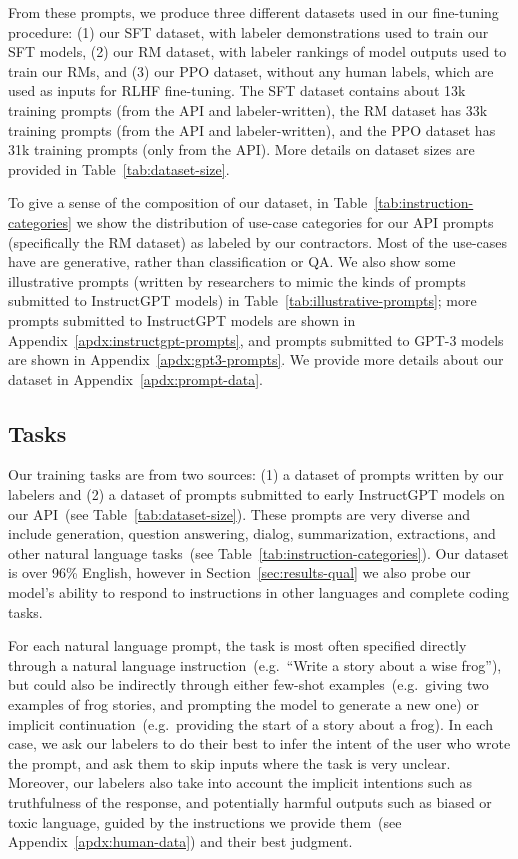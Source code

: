 \documentclass{article}
\begin{document}
From these prompts, we produce three different datasets used in our fine-tuning procedure: (1) our SFT dataset, with labeler demonstrations used to train our SFT models, (2) our RM dataset, with labeler rankings of model outputs used to train our RMs, and (3) our PPO dataset, without any human labels, which are used as inputs for RLHF fine-tuning. The SFT dataset contains about 13k training prompts (from the API and labeler-written), the RM dataset has 33k training prompts (from the API and labeler-written), and the PPO dataset has 31k training prompts (only from the API). More details on dataset sizes are provided in Table~\ref{tab:dataset-size}. 

To give a sense of the composition of our dataset, in Table~\ref{tab:instruction-categories} we show the distribution of use-case categories for our API prompts (specifically the RM dataset) as labeled by our contractors. Most of the use-cases have are generative, rather than classification or QA. We also show some illustrative prompts (written by researchers to mimic the kinds of prompts submitted to InstructGPT models) in Table~\ref{tab:illustrative-prompts}; more prompts submitted to InstructGPT models are shown in Appendix~\ref{apdx:instructgpt-prompts}, and prompts submitted to GPT-3 models are shown in Appendix~\ref{apdx:gpt3-prompts}.
We provide more details about our dataset in Appendix~\ref{apdx:prompt-data}.

\subsection{Tasks}
\label{sec:task}

Our training tasks are from two sources: (1) a dataset of prompts written by our labelers and (2) a dataset of prompts submitted to early InstructGPT models on our API~(see Table~\ref{tab:dataset-size}). These prompts are very diverse and include generation, question answering, dialog, summarization, extractions, and other natural language tasks~(see Table~\ref{tab:instruction-categories}). Our dataset is over 96\% English, however in Section~\ref{sec:results-qual} we also probe our model's ability to respond to instructions in other languages and complete coding tasks.

For each natural language prompt, the task is most often specified directly through a natural language instruction~(e.g.\ ``Write a story about a wise frog''), but could also be indirectly through either few-shot examples~(e.g.\ giving two examples of frog stories, and prompting the model to generate a new one) or implicit continuation~(e.g.\ providing the start of a story about a frog). In each case, we ask our labelers to do their best to infer the intent of the user who wrote the prompt, and ask them to skip inputs where the task is very unclear. Moreover, our labelers also take into account the implicit intentions such as truthfulness of the response, and potentially harmful outputs such as biased or toxic language, guided by the instructions we provide them~(see Appendix~\ref{apdx:human-data}) and their best judgment.
\end{document}

